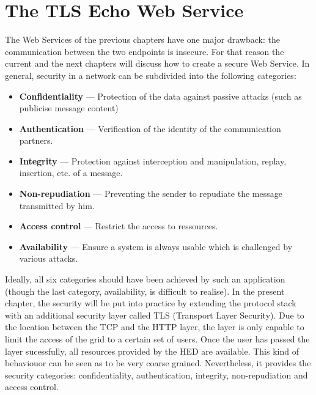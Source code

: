 \chapter{The TLS Echo Web Service}

The Web Services of the previous chapters have one major drawback: the communication between the two endpoints is insecure.
For that reason the current and the next chapters will discuss how to create a secure Web Service.
In general, security in a network can be subdivided into the following categories:~\cite{TANNENBAUM_2001}
\begin{itemize}
	\item \textbf{Confidentiality} --- Protection of the data against passive attacks (such as publicise message content)
	
	\item \textbf{Authentication} --- Verification of the identity of the communication partners.

	\item \textbf{Integrity} --- Protection against interception and manipulation, replay, insertion, etc.  of a message.

	\item \textbf{Non-repudiation} --- Preventing the sender to repudiate the message transmitted by him.

	\item \textbf{Access control} --- Restrict the access to ressources.

	\item \textbf{Availability} --- Ensure a system is always usable which is challenged by various attacks.

\end{itemize}
%
Ideally, all six categories should have been achieved by such an application (though the last category, availability, is difficult to realise).
In the present chapter, the security will be put into practice by extending the protocol stack with an additional security layer called TLS (Transport Layer Security).
Due to the location between the TCP and the HTTP layer, the layer is only capable to limit the access of the grid to a certain set of users. Once the user has passed the layer sucessfully, all resources provided by the HED are available. This kind of behaviouor can be seen as to be very coarse grained.
Nevertheless, it provides the security categories: confidentiality, authentication, integrity, non-repudiation and access control.\\


